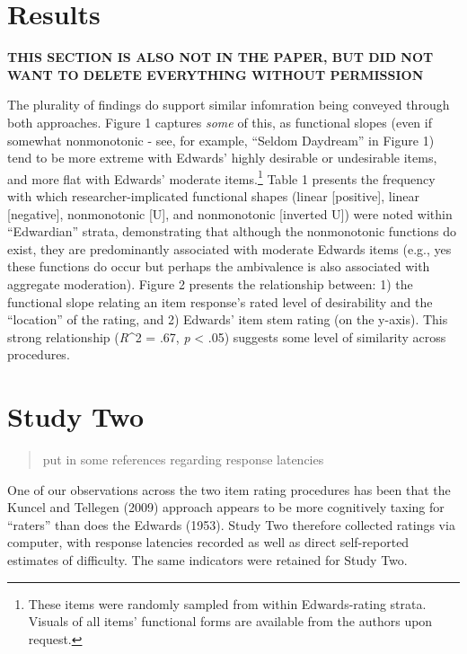 \documentclass[
  ,jou]{apa6}
\begin{document}
\hypertarget{results-1}{%
\section{Results}\label{results-1}}

\textbf{THIS SECTION IS ALSO NOT IN THE PAPER, BUT DID NOT WANT TO DELETE EVERYTHING WITHOUT PERMISSION}

The plurality of findings do support similar infomration being conveyed through both approaches. Figure 1 captures \emph{some} of this, as functional slopes (even if somewhat nonmonotonic - see, for example, ``Seldom Daydream'' in Figure 1) tend to be more extreme with Edwards' highly desirable or undesirable items, and more flat with Edwards' moderate items.\footnote{These items were randomly sampled from within Edwards-rating strata. Visuals of all items' functional forms are available from the authors upon request.} Table 1 presents the frequency with which researcher-implicated functional shapes (linear {[}positive{]}, linear {[}negative{]}, nonmonotonic {[}U{]}, and nonmonotonic {[}inverted U{]}) were noted within ``Edwardian'' strata, demonstrating that although the nonmonotonic functions do exist, they are predominantly associated with moderate Edwards items (e.g., yes these functions do occur but perhaps the ambivalence is also associated with aggregate moderation). Figure 2 presents the relationship between: 1) the functional slope relating an item response's rated level of desirability and the ``location'' of the rating, and 2) Edwards' item stem rating (on the y-axis). This strong relationship (\emph{R}\^{}2 = .67, \emph{p} \textless{} .05) suggests some level of similarity across procedures.

\hypertarget{study-two}{%
\section{Study Two}\label{study-two}}

\begin{quote}
put in some references regarding response latencies
\end{quote}

One of our observations across the two item rating procedures has been that the Kuncel and Tellegen (2009) approach appears to be more cognitively taxing for ``raters'' than does the Edwards (1953). Study Two therefore collected ratings via computer, with response latencies recorded as well as direct self-reported estimates of difficulty. The same indicators were retained for Study Two.
\end{document}
